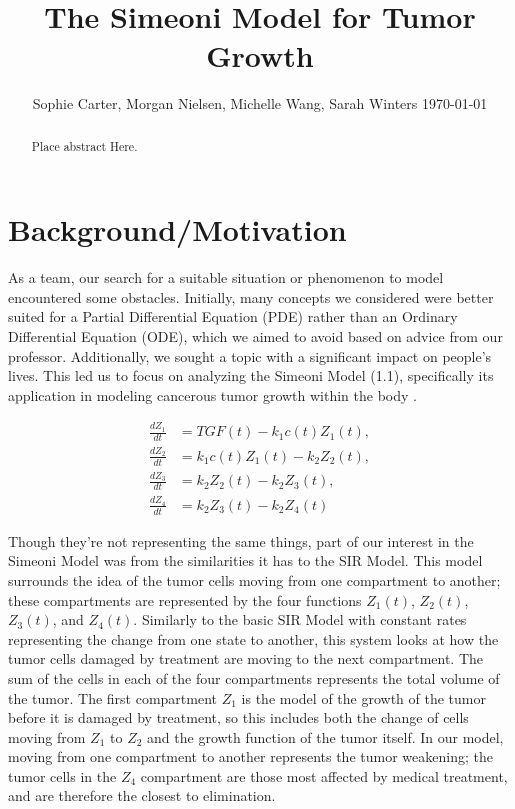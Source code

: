 \documentclass[11pt]{amsart}
\begin{document}
\title{The Simeoni Model for Tumor Growth}
\author{Sophie Carter, Morgan Nielsen, Michelle Wang, Sarah Winters \today}


\maketitle

\begin{abstract}
Place abstract Here.
\end{abstract}

\section{Background/Motivation}
As a team, our search for a suitable situation or phenomenon to model encountered some obstacles. Initially, many concepts we considered were better suited for a Partial Differential Equation (PDE) rather than an Ordinary Differential Equation (ODE), which we aimed to avoid based on advice from our professor. Additionally, we sought a topic with a significant impact on people's lives. This led us to focus on analyzing the Simeoni Model (1.1), specifically its application in modeling cancerous tumor growth within the body \cite{Koziol_Falls_Schnitzer_2020}.

\begin{equation}\label{eq:1.1}
\begin{aligned}
    \frac{dZ_1}{dt} &= TGF(t) - k_1c(t)Z_1(t), \\
    \frac{dZ_2}{dt} &= k_1c(t)Z_1(t) - k_2Z_2(t), \\ 
    \frac{dZ_3}{dt} &= k_2Z_2(t) - k_2Z_3(t), \\
    \frac{dZ_4}{dt} &= k_2Z_3(t) - k_2Z_4(t)
\end{aligned}
\tag*{(1.1)}
\end{equation}
\hspace{2em}
 
Though they're not representing the same things, part of our interest in the Simeoni Model was from the similarities it has to the SIR Model. This model surrounds the idea of the tumor cells moving from one compartment to another; these compartments are represented by the four functions $Z_1(t)$, $Z_2(t)$, $Z_3(t)$, and $Z_4(t)$. Similarly to the basic SIR Model with constant rates representing the change from one state to another, this system looks at how the tumor cells damaged by treatment are moving to the next compartment. The sum of the cells in each of the four compartments represents the total volume of the tumor. The first compartment $Z_1$ is the model of the growth of the tumor before it is damaged by treatment, so this includes both the change of cells moving from $Z_1$ to $Z_2$ and the growth function of the tumor itself. In our model, moving from one compartment to another represents the tumor weakening; the tumor cells in the $Z_4$ compartment are those most affected by medical treatment, and are therefore the closest to elimination. 
\end{document}
